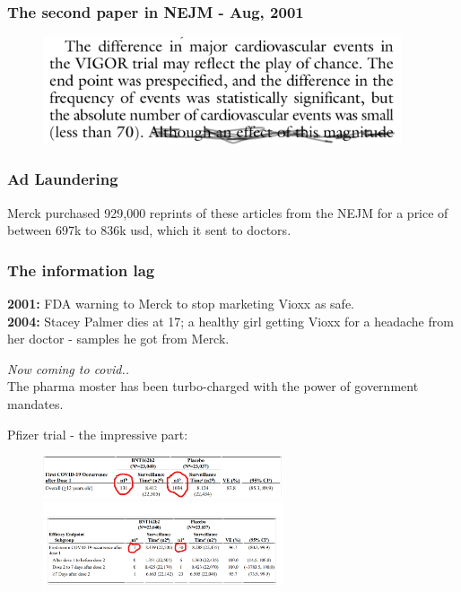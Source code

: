 \documentclass[shadesubsections,compress,14pt,mathserif]{beamer}
\newcommand{\nl}{\\ \pause \vspace{0.2in}}
\newcommand{\nlnp}{\\ \vspace{0.2in}}
\begin{document}
\begin{frame}
 \frametitle{The second paper in NEJM - Aug, 2001}
 \begin{figure}
  \includegraphics[width=300pt]{secondpaperquote.png}
\end{figure}

 
\end{frame}
\begin{frame}
 \frametitle{Ad Laundering}
 Merck purchased 929,000 reprints of these articles from the NEJM for a price of between 697k to 836k usd, which it sent
 to doctors.
\end{frame}
\begin{frame}
 \frametitle{The information lag}
 \textbf{2001:} FDA warning to Merck to stop marketing Vioxx as safe.\nlnp
 \textbf{2004:} Stacey Palmer dies at 17; a healthy girl getting Vioxx for a headache from her doctor - samples he got from Merck.
 \end{frame}
\begin{frame}
 \emph{Now coming to covid..}\nl
The pharma moster has been turbo-charged with the power of government mandates.
\end{frame}
\begin{frame}
 Pfizer trial - the impressive part:
 \begin{figure}
  \includegraphics[width=200pt]{pfizergood1.png}
  \includegraphics[width=200pt]{pfizergood2.png}
\end{figure}

\end{frame}
\end{document}
